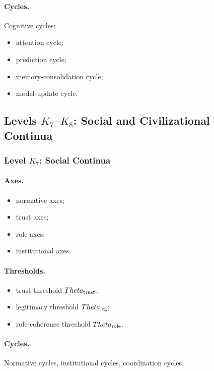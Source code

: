 \paragraph{Cycles.}
Cognitive cycles:
\begin{itemize}
    \item attention cycle;
    \item prediction cycle;
    \item memory-consolidation cycle;
    \item model-update cycle.
\end{itemize}


\subsection{Levels \texorpdfstring{\texorpdfstring{$K_7$}{K\_7}–\texorpdfstring{$K_8$}{K\_8}}{K7–K8}: Social and Civilizational Continua}

\subsubsection{Level \texorpdfstring{\(K_7\)}{K7}: Social Continua}

\paragraph{Axes.}
\begin{itemize}
    \item normative axes;
    \item trust axes;
    \item role axes;
    \item institutional axes.
\end{itemize}

\paragraph{Thresholds.}
\begin{itemize}
    \item trust threshold \(\Theta_{\rm trust}\);
    \item legitimacy threshold \(\Theta_{\rm leg}\);
    \item role-coherence threshold \(\Theta_{\rm role}\).
\end{itemize}

\paragraph{Cycles.}
Normative cycles, institutional cycles, coordination cycles.

